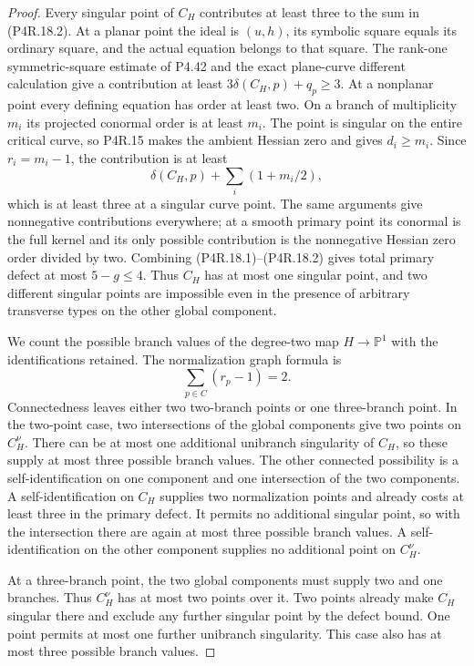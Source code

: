 \begin{proof}
Every singular point of $C_H$ contributes at least three
to the sum in (P4R.18.2). At a planar point the ideal is
$(u,h)$, its symbolic square equals its ordinary square,
and the actual equation belongs to that square. The
rank-one symmetric-square estimate of P4.42 and the exact
plane-curve different calculation give a contribution at
least $3\delta(C_H,p)+q_p\ge3$.
At a nonplanar point every defining equation has order at
least two. On a branch of multiplicity $m_i$ its projected
conormal order is at least $m_i$. The point is singular
on the entire critical curve, so P4R.15 makes the ambient
Hessian zero and gives $d_i\ge m_i$. Since $r_i=m_i-1$,
the contribution is at least
\[
                      \delta(C_H,p)+\sum_i(1+m_i/2),
\]
which is at least three at a singular curve point. The
same arguments give nonnegative contributions everywhere;
at a smooth primary point its conormal is the full kernel
and its only possible contribution is the nonnegative
Hessian zero order divided by two.
Combining (P4R.18.1)--(P4R.18.2) gives total primary
defect at most $5-g\le4$. Thus $C_H$ has at most one
singular point, and two different singular points are
impossible even in the presence of arbitrary transverse
types on the other global component.

We count the possible branch values of the degree-two map
$H\to\mathbb P^1$ with the identifications retained.
The normalization graph formula is
\[
                         \sum_{p\in C}(r_p-1)=2.
\]
Connectedness leaves either two two-branch points or one
three-branch point. In the two-point case, two intersections
of the global components give two points on $C_H^\nu$.
There can be at most one additional unibranch singularity
of $C_H$, so these supply at most three possible branch
values. The other connected possibility is a self-identification
on one component and one intersection of the two components.
A self-identification on $C_H$ supplies two normalization
points and already costs at least three in the primary
defect. It permits no additional singular point, so with
the intersection there are again at most three possible
branch values. A self-identification on the other component
supplies no additional point on $C_H^\nu$.

At a three-branch point, the two global components must
supply two and one branches. Thus $C_H^\nu$ has at most
two points over it. Two points already make $C_H$ singular
there and exclude any further singular point by the defect
bound. One point permits at most one further unibranch
singularity. This case also has at most three possible
branch values.


\end{proof}
